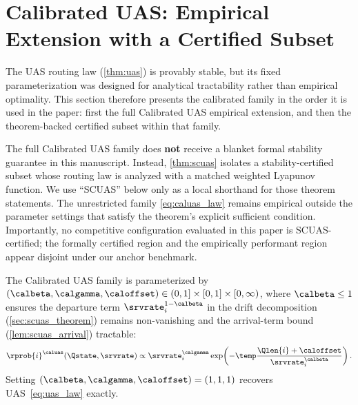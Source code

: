\section{Calibrated UAS: Empirical Extension with a Certified Subset}
\label{sec:calibrated_uas}

The UAS routing law (\cref{thm:uas}) is provably stable, but its fixed parameterization was designed for analytical tractability rather than empirical optimality.
This section therefore presents the calibrated family in the order it is used in the paper:
first the full Calibrated UAS empirical extension, and then the theorem-backed certified subset within that family.

\begin{remark}
\label{rem:caluas_status}
The full Calibrated UAS family does \textbf{not} receive a blanket formal stability guarantee in this manuscript.
Instead, \cref{thm:scuas} isolates a stability-certified subset whose routing law is analyzed with a matched weighted Lyapunov function. We use ``SCUAS'' below only as a local shorthand for those theorem statements.
The unrestricted family \eqref{eq:caluas_law} remains empirical outside the parameter settings that satisfy the theorem's explicit sufficient condition.
Importantly, no competitive configuration evaluated in this paper is SCUAS-certified; the formally certified region and the empirically performant region appear disjoint under our anchor benchmark.
\end{remark}

\begin{definition}
\label{def:caluas_family}
The Calibrated UAS family is parameterized by $(\calbeta, \calgamma, \caloffset) \in (0,1] \times [0,1] \times [0,\infty)$, where $\calbeta \le 1$ ensures the departure term $\srvrate_i^{1-\calbeta}$ in the drift decomposition (\cref{sec:scuas_theorem}) remains non-vanishing and the arrival-term bound (\cref{lem:scuas_arrival}) tractable:
\begin{equation}
\label{eq:caluas_law}
\rprob{i}^{\caluas}(\Qstate, \srvrate) \propto \srvrate_i^{\calgamma} \exp\!\left(-\temp \frac{\Qlen{i}+\caloffset}{\srvrate_i^{\calbeta}}\right).
\end{equation}
Setting $(\calbeta, \calgamma, \caloffset) = (1, 1, 1)$ recovers UAS~\eqref{eq:uas_law} exactly.
\end{definition}

